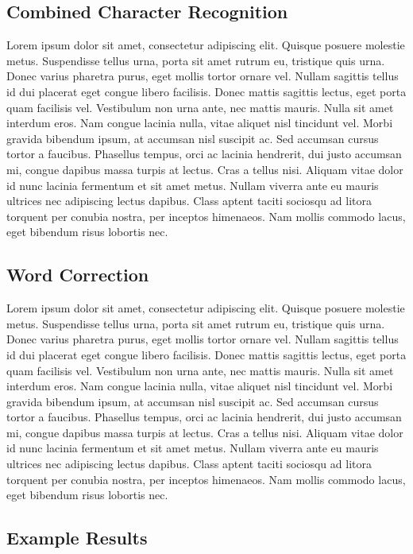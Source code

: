 \documentclass[12pt]{article}
\begin{document}
	\subsection{Combined Character Recognition}
	Lorem ipsum dolor sit amet, consectetur adipiscing elit. Quisque posuere molestie metus. Suspendisse tellus urna, porta sit amet rutrum eu, tristique quis urna. Donec varius pharetra purus, eget mollis tortor ornare vel. Nullam sagittis tellus id dui placerat eget congue libero facilisis. Donec mattis sagittis lectus, eget porta quam facilisis vel. Vestibulum non urna ante, nec mattis mauris. Nulla sit amet interdum eros. Nam congue lacinia nulla, vitae aliquet nisl tincidunt vel. Morbi gravida bibendum ipsum, at accumsan nisl suscipit ac. Sed accumsan cursus tortor a faucibus. Phasellus tempus, orci ac lacinia hendrerit, dui justo accumsan mi, congue dapibus massa turpis at lectus. Cras a tellus nisi. Aliquam vitae dolor id nunc lacinia fermentum et sit amet metus. Nullam viverra ante eu mauris ultrices nec adipiscing lectus dapibus. Class aptent taciti sociosqu ad litora torquent per conubia nostra, per inceptos himenaeos. Nam mollis commodo lacus, eget bibendum risus lobortis nec.
	
	\subsection{Word Correction}
	Lorem ipsum dolor sit amet, consectetur adipiscing elit. Quisque posuere molestie metus. Suspendisse tellus urna, porta sit amet rutrum eu, tristique quis urna. Donec varius pharetra purus, eget mollis tortor ornare vel. Nullam sagittis tellus id dui placerat eget congue libero facilisis. Donec mattis sagittis lectus, eget porta quam facilisis vel. Vestibulum non urna ante, nec mattis mauris. Nulla sit amet interdum eros. Nam congue lacinia nulla, vitae aliquet nisl tincidunt vel. Morbi gravida bibendum ipsum, at accumsan nisl suscipit ac. Sed accumsan cursus tortor a faucibus. Phasellus tempus, orci ac lacinia hendrerit, dui justo accumsan mi, congue dapibus massa turpis at lectus. Cras a tellus nisi. Aliquam vitae dolor id nunc lacinia fermentum et sit amet metus. Nullam viverra ante eu mauris ultrices nec adipiscing lectus dapibus. Class aptent taciti sociosqu ad litora torquent per conubia nostra, per inceptos himenaeos. Nam mollis commodo lacus, eget bibendum risus lobortis nec.
	
	\subsection{Example Results}
	
\end{document}
